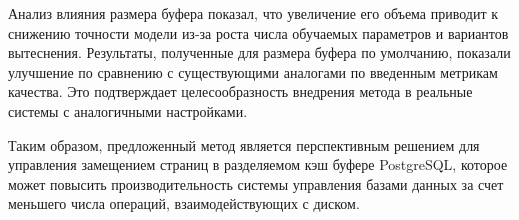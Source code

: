 Анализ влияния размера буфера показал, что увеличение его объема  приводит к снижению точности модели из-за роста числа обучаемых параметров и вариантов вытеснения.
Результаты, полученные для размера буфера по умолчанию, показали улучшение по сравнению с существующими аналогами по введенным метрикам качества.
Это подтверждает целесообразность внедрения метода в реальные системы с аналогичными настройками.

Таким образом, предложенный метод является перспективным решением для управления замещением страниц в разделяемом кэш буфере PostgreSQL, которое может повысить производительность системы управления базами данных за счет меньшего числа операций, взаимодействующих с диском.